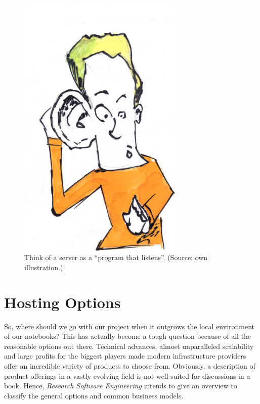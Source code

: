 \documentclass[
  12pt,
  letterpaper,
]{krantz}
\begin{document}
\begin{figure}

{\centering \includegraphics[width=3.125in,height=\textheight]{./images/listen.jpg}

}

\caption{Think of a server as a ``program that listens''. (Source: own
illustration.)}

\end{figure}

\hypertarget{hosting-options}{%
\section{Hosting Options}\label{hosting-options}}

So, where should we go with our project when it outgrows the local
environment of our notebooks? This has actually become a tough question
because of all the reasonable options out there. Technical advances,
almost unparalleled scalability and large profits for the biggest
players made modern infrastructure providers offer
an incredible variety of products to choose from. Obviously, a
description of product offerings in a vastly evolving field is not well
suited for discussions in a book. Hence, \emph{Research Software
Engineering} intends to give an overview to classify the general options
and common business models.
\end{document}
